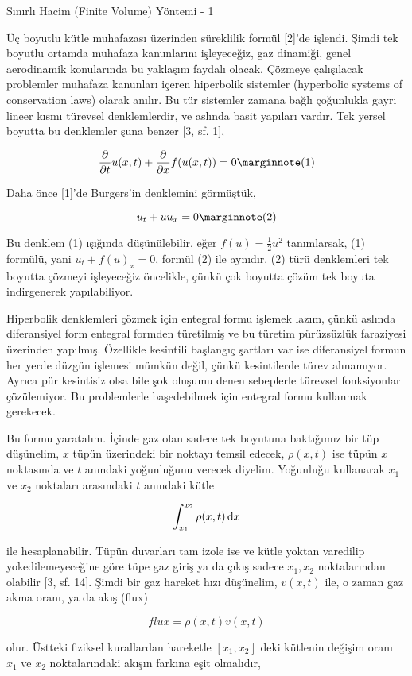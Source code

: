 \documentclass[12pt,fleqn]{article}\usepackage{../../common}
\begin{document}
Sınırlı Hacim (Finite Volume) Yöntemi - 1

Üç boyutlu kütle muhafazası üzerinden süreklilik formül [2]'de işlendi.  Şimdi
tek boyutlu ortamda muhafaza kanunlarını işleyeceğiz, gaz dinamiği, genel
aerodinamik konularında bu yaklaşım faydalı olacak. Çözmeye çalışılacak
problemler muhafaza kanunları içeren hiperbolik sistemler (hyperbolic systems of
conservation laws) olarak anılır. Bu tür sistemler zamana bağlı çoğunlukla gayrı
lineer kısmı türevsel denklemlerdir, ve aslında basit yapıları vardır. Tek
yersel boyutta bu denklemler şuna benzer [3, sf. 1],

$$
\frac{\partial }{\partial t} u(x,t) + 
\frac{\partial }{\partial x} f(u(x,t)) = 0
\mlabel{1}
$$

Daha önce [1]'de Burgers'in denklemini görmüştük, 

$$
u_t + uu_x = 0
\mlabel{2}
$$

Bu denklem (1) ışığında düşünülebilir, eğer $f(u) = \frac{1}{2}u^2$ tanımlarsak,
(1) formülü, yani $u_t + f(u)_x = 0$, formül (2) ile aynıdır. (2) türü
denklemleri tek boyutta çözmeyi işleyeceğiz öncelikle, çünkü çok boyutta çözüm
tek boyuta indirgenerek yapılabiliyor.

Hiperbolik denklemleri çözmek için entegral formu işlemek lazım, çünkü aslında
diferansiyel form entegral formden türetilmiş ve bu türetim pürüzsüzlük
faraziyesi üzerinden yapılmış. Özellikle kesintili başlangıç şartları var ise
diferansiyel formun her yerde düzgün işlemesi mümkün değil, çünkü kesintilerde
türev alınamıyor. Ayrıca pür kesintisiz olsa bile şok oluşumu denen sebeplerle
türevsel fonksiyonlar çözülemiyor. Bu problemlerle başedebilmek için entegral
formu kullanmak gerekecek. 

Bu formu yaratalım. İçinde gaz olan sadece tek boyutuna baktığımız bir tüp
düşünelim, $x$ tüpün üzerindeki bir noktayı temsil edecek, $\rho(x,t)$ ise tüpün
$x$ noktasında ve $t$ anındaki yoğunluğunu verecek diyelim. Yoğunluğu kullanarak
$x_1$ ve $x_2$ noktaları arasındaki $t$ anındaki kütle

$$
\int _{x_1}^{x_2} \rho(x,t) \,\mathrm{d} x
$$

ile hesaplanabilir. Tüpün duvarları tam izole ise ve kütle yoktan varedilip
yokedilemeyeceğine göre tüpe gaz giriş ya da çıkış sadece $x_1,x_2$
noktalarından olabilir [3, sf. 14]. Şimdi bir gaz hareket hızı düşünelim,
$v(x,t)$ ile, o zaman gaz akma oranı, ya da akış (flux)

$$
flux = \rho(x,t) v(x,t)
$$

olur. Üstteki fiziksel kurallardan hareketle $[x_1,x_2]$ deki kütlenin
değişim oranı $x_1$ ve $x_2$ noktalarındaki akışın farkına eşit olmalıdır,
\end{document}

